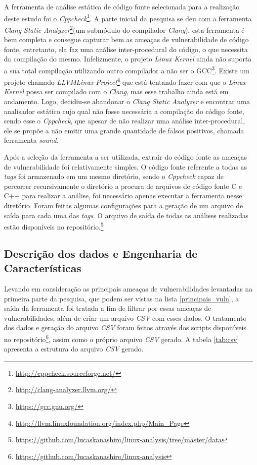 A ferramenta de análise estática de código fonte selecionada para a realização
deste estudo foi o
\textit{Cppcheck}\footnote{\url{http://cppcheck.sourceforge.net/}}.  A parte
inicial da pesquisa se deu com a ferramenta \textit{Clang Static
Analyzer}\footnote{\url{http://clang-analyzer.llvm.org/}}(um submódulo do
compilador \textit{Clang}), esta ferramenta é bem completa e consegue capturar
bem as ameaças de vulnerabilidade de código fonte, entretanto, ela faz uma
análise inter-procedural do código, o que necessita da compilação do mesmo.
Infelizmente, o projeto \textit{Linux Kernel} ainda não suporta a sua total
compilação utilizando outro compilador a não ser o
GCC\footnote{\url{https://gcc.gnu.org/}}. Existe um projeto chamado
\textit{LLVMLinux
Project}\footnote{\url{http://llvm.linuxfoundation.org/index.php/Main_Page}} que
está tentando fazer com que o \textit{Linux Kernel} possa ser compilado com o
\textit{Clang}, mas esse trabalho ainda está em andamento. Logo, decidiu-se
abandonar o \textit{Clang Static Analyzer} e encontrar uma analisador estático
cujo qual não fosse necessária a compilação do código fonte, sendo esse o
\textit{Cppcheck}, que apesar de não realizar uma análise inter-procedural, ele
se propõe a não emitir uma grande quantidade de falsos positivos, chamada
ferramenta \textit{sound}.

Após a seleção da ferramenta a ser utilizada, extrair do código fonte as
ameaças de vulnerabilidade foi relativamente simples. O código fonte referente a
todas as \textit{tags} foi armazenado em um mesmo diretório, sendo o
\textit{Cppcheck} capaz de percorrer recursivamente o diretório a procura de
arquivos de código fonte C e C++ para realizar a análise, foi necessário apenas
executar a ferramenta nesse diretório. Foram feitas algumas configurações para a
geração de um arquivo de saída para cada uma das \textit{tags}. O arquivo de
saída de todas as análises realizadas estão disponíveis no
repositório.\footnote{\url{https://github.com/lucaskanashiro/linux-analysis/tree/master/data}}

\subsection{Descrição dos dados e Engenharia de Características}

Levando em consideração as principais ameaças de vulnerabilidades levantadas na
primeira parte da pesquisa, que podem ser vistas na lista \ref{principais_vuln},
a saída da ferramenta foi tratada a fim de filtrar por essas ameaças de
vulnerabilidades, além de criar um arquivo \textit{CSV} com esses dados. O
tratamento dos dados e geração do arquivo \textit{CSV} foram feitos através dos
scripts disponíveis no
repositório\footnote{\url{https://github.com/lucaskanashiro/linux-analysis}},
assim como o próprio arquivo \textit{CSV} gerado. A tabela \ref{tab:csv}
apresenta a estrutura do arquivo \textit{CSV} gerado.

